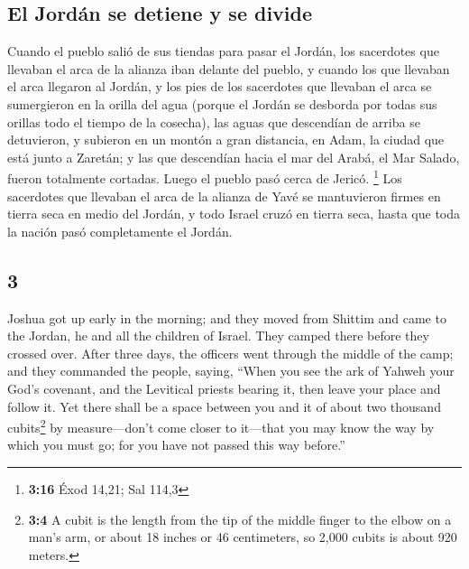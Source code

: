 \begin{paracol}{2}
\hypertarget{el-jorduxe1n-se-detiene-y-se-divide}{%
\subsection{El Jordán se detiene y se
divide}\label{el-jorduxe1n-se-detiene-y-se-divide}}

 Cuando el pueblo salió de sus tiendas para pasar el
Jordán, los sacerdotes que llevaban el arca de la alianza iban delante
del pueblo,  y cuando los que llevaban el arca llegaron
al Jordán, y los pies de los sacerdotes que llevaban el arca se
sumergieron en la orilla del agua (porque el Jordán se desborda por
todas sus orillas todo el tiempo de la cosecha),  las
aguas que descendían de arriba se detuvieron, y subieron en un montón a
gran distancia, en Adam, la ciudad que está junto a Zaretán; y las que
descendían hacia el mar del Arabá, el Mar Salado, fueron totalmente
cortadas. Luego el pueblo pasó cerca de Jericó. \footnote{\textbf{3:16}
  Éxod 14,21; Sal 114,3}  Los sacerdotes que llevaban el
arca de la alianza de Yavé se mantuvieron firmes en tierra seca en medio
del Jordán, y todo Israel cruzó en tierra seca, hasta que toda la nación
pasó completamente el Jordán.

\switchcolumn
\begin{otherlanguage}{english}

\hypertarget{section-5}{%
\section{3}\label{section-5}}

 Joshua got up early in the morning; and they moved from
Shittim and came to the Jordan, he and all the children of Israel. They
camped there before they crossed over.  After three days,
the officers went through the middle of the camp;  and
they commanded the people, saying, ``When you see the ark of Yahweh your
God's covenant, and the Levitical priests bearing it, then leave your
place and follow it.  Yet there shall be a space between
you and it of about two thousand cubits\footnote{\textbf{3:4} A cubit is
  the length from the tip of the middle finger to the elbow on a man's
  arm, or about 18 inches or 46 centimeters, so 2,000 cubits is about
  920 meters.} by measure---don't come closer to it---that you may know
the way by which you must go; for you have not passed this way before.''


\end{otherlanguage}
\end{paracol}

